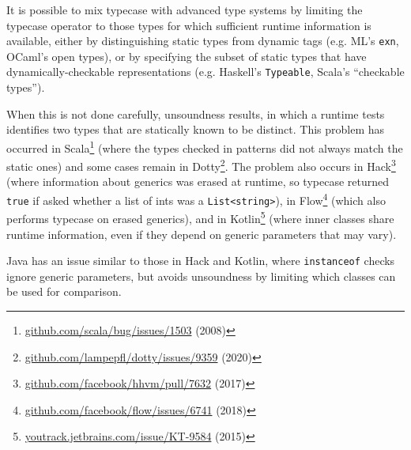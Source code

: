 \documentclass[11pt,oneside]{article}
\newcommand{\code}[1]{\texttt{#1}}
\begin{document}
It is possible to mix typecase with advanced type systems by limiting the typecase operator to those types for which sufficient runtime information is available, either by distinguishing static types from dynamic tags (e.g. ML's \code{exn}, OCaml's open types), or by specifying the subset of static types that have dynamically-checkable representations (e.g. Haskell's \code{Typeable}, Scala's ``checkable types'').

When this is not done carefully, unsoundness results, in which a runtime tests identifies two types that are statically known to be distinct. This problem has occurred in Scala\footnote{\href{https://github.com/scala/bug/issues/1503}{github.com/\allowbreak{}scala/\allowbreak{}bug/\allowbreak{}issues/\allowbreak{}1503} (2008)} (where the types checked in patterns did not always match the static ones) and some cases remain in Dotty\footnote{\href{https://github.com/lampepfl/dotty/issues/9359}{github.com/\allowbreak{}lampepfl/\allowbreak{}dotty/\allowbreak{}issues/\allowbreak{}9359} (2020)}. The problem also occurs in Hack\footnote{\href{https://github.com/facebook/hhvm/pull/7632}{github.com/\allowbreak{}facebook/\allowbreak{}hhvm/\allowbreak{}pull/\allowbreak{}7632} (2017)} (where information about generics was erased at runtime, so typecase returned \code{true} if asked whether a list of ints was a \code{List<string>}), in Flow\footnote{\href{https://github.com/facebook/flow/issues/6741}{github.com/\allowbreak{}facebook/\allowbreak{}flow/\allowbreak{}issues/\allowbreak{}6741} (2018)} (which also performs typecase on erased generics), and in Kotlin\footnote{\href{https://youtrack.jetbrains.com/issue/KT-9584}{youtrack.jetbrains.com/\allowbreak{}issue/\allowbreak{}KT-9584} (2015)} (where inner classes share runtime information, even if they depend on generic parameters that may vary).

Java has an issue similar to those in Hack and Kotlin, where \code{instanceof} checks ignore generic parameters, but avoids unsoundness by limiting which classes can be used for comparison.
\end{document}

